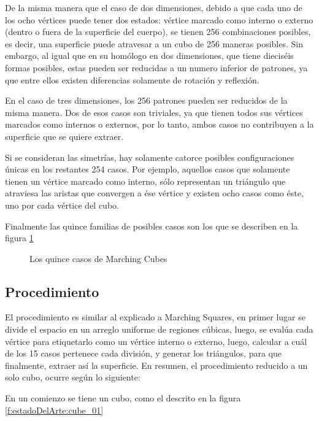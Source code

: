 De la misma manera que el caso de dos dimensiones, debido a que cada uno de los ocho 
vértices puede tener dos estados: vértice marcado como interno o externo (dentro o fuera de la 
superficie del cuerpo), se tienen 256 combinaciones posibles, es decir, una superficie puede
atravesar a un cubo de 256 maneras posibles. Sin embargo, al igual que en su homólogo en dos 
dimensiones, que tiene dieciséis formas posibles, estas pueden ser reducidas a un numero inferior 
de patrones, ya que entre ellos existen diferencias solamente de rotación y reflexión.

En el caso de tres dimensiones, los 256 patrones pueden ser reducidos de la misma 
manera. Dos de esos casos son triviales, ya que tienen todos sus vértices marcados como internos 
o externos, por lo tanto, ambos casos no contribuyen a la superficie que se quiere extraer.

Si se consideran las simetrías, hay solamente catorce posibles configuraciones únicas en 
los restantes 254 casos. Por ejemplo, aquellos casos que solamente tienen un vértice marcado 
como interno, sólo representan un triángulo que atraviesa las aristas que convergen a ése vértice y 
existen ocho casos como éste, uno por cada vértice del cubo.

Finalmente las quince familias de posibles casos son los que se describen en la figura \ref{f:estadoDelArte:MarchingCubes}

\begin{figure}[hbp]
\centering
\caption{Los quince casos de Marching Cubes}
\label{f:estadoDelArte:MarchingCubes}
\end{figure}

\subsection{Procedimiento}
\label{subsec:marchingCubes:procedimiento}

El procedimiento es similar al explicado a Marching Squares, en primer lugar se divide el 
espacio en un arreglo uniforme de regiones cúbicas, luego, se evalúa cada vértice para etiquetarlo 
como un vértice interno o externo, luego, calcular a cuál de los 15 casos pertenece cada división, 
y generar los triángulos, para que finalmente, extraer así la superficie.
En resumen, el procedimiento reducido a un solo cubo, ocurre según lo siguiente:

En un comienzo se tiene un cubo, como el descrito en la figura \ref{f:estadoDelArte:cube_01}

